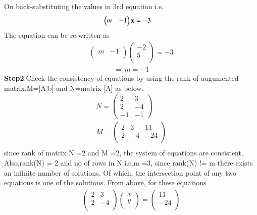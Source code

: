 \documentclass[journal,12pt,twocolumn]{IEEEtran}
\begin{document}
On back-substituting the values in 3rd equation i.e.\\
\begin{align}
\begin{pmatrix}m & -1 \end{pmatrix}\mathbf{x}&=-3
\end{align}
The equation can be re-written as\\
\begin{align*}
\begin{pmatrix}m & -1\\\end{pmatrix} \begin{pmatrix}-2\\5\\\end{pmatrix}=-3
\end{align*}
\begin{align}
\Rightarrow m=-1
\end{align}
\textbf{Step2}:Check the consistency of equations by using the rank of augumented matrix,M=[A'b] and N=matrix [A] as below.
\begin{align*}
N=\begin{pmatrix}2 & 3\\2 & -4\\-1 & -1\end{pmatrix}\\
M=\begin{pmatrix}2 & 3 & 11\\2 & -4 & -24\\\end{pmatrix}\\
\end{align*}
since rank of matrix N =2 and M =2, the system of equations are consistent.\\ 
Also,rank(N) = 2 and no of rows in N i.e.m =3, since rank(N) != m there exists an infinite number of solutions. Of which, the intersection point of any two equations is one of the solutions. From above, for these equations
\begin{align*}
\begin{pmatrix}2 & 3\\2 & -4\\\end{pmatrix}
\begin{pmatrix}x\\y\\\end{pmatrix}=
\begin{pmatrix}11\\-24\\\end{pmatrix}
\end{align*}
\end{document}
